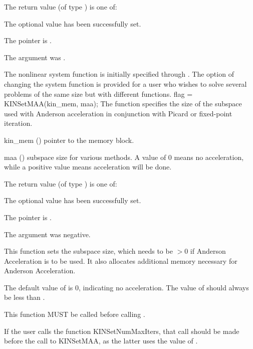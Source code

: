 {
  The return value  (of type ) is one of:
  \begin{args}
  \item[\Id{KIN\_SUCCESS}]
    The optional value has been successfully set.
  \item[\Id{KIN\_MEM\_NULL}]
    The  pointer is .
  \item[\Id{KIN\_ILL\_INPUT}]
    The argument  was .
  \end{args}
}
{
  The nonlinear system function is initially specified through .
  The option of changing the system function is provided for a user who wishes
  to solve several problems of the same size but with different functions.
}
{
flag = KINSetMAA(kin\_mem, maa);
}
{
  The function  specifies the size of the subspace used with
  Anderson acceleration in conjunction with Picard or fixed-point iteration.
}
{
  \begin{args}
  \item[kin\_mem] ()
    pointer to the {\kinsol} memory block.
  \item[maa] ()
    subspace size for various methods.  A value of 0 means no acceleration,
    while a positive value means acceleration will be done.
  \end{args}
}
{
  The return value  (of type ) is one of:
  \begin{args}
  \item[\Id{KIN\_SUCCESS}]
    The optional value has been successfully set.
  \item[\Id{KIN\_MEM\_NULL}]
    The  pointer is .
  \item[\Id{KIN\_ILL\_INPUT}]
    The argument  was negative.
  \end{args}
}
{
  This function sets the subspace size, which needs to be $> 0$ if Anderson
  Acceleration is to be used.
  It also allocates additional memory necessary for Anderson Acceleration.

  The default value of  is 0, indicating no acceleration.  The value of 
  should always be less than .

  This function MUST be called before calling .

  If the user calls the function KINSetNumMaxIters, that call should be made
  before the call to KINSetMAA, as the latter uses the value of .
}

